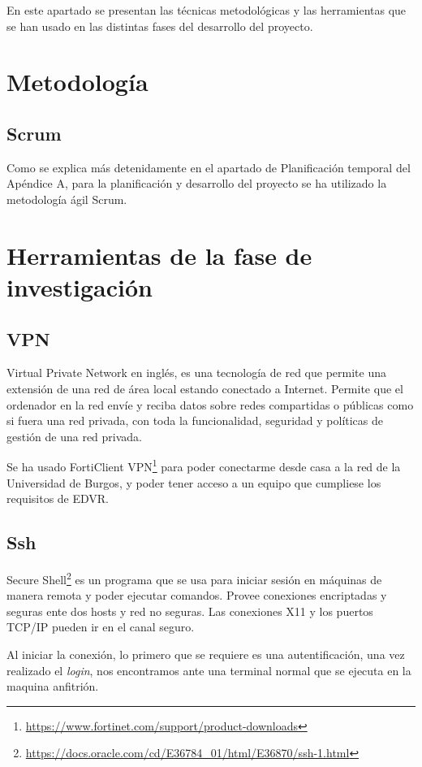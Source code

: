 
En este apartado se presentan las técnicas metodológicas y las herramientas que se han usado en las distintas fases del desarrollo del proyecto.

\section{Metodología}

    \subsection{Scrum}
    Como se explica más detenidamente en el apartado de Planificación temporal del Apéndice A, para la planificación y desarrollo del proyecto se ha utilizado la metodología ágil Scrum.


\section{Herramientas de la fase de investigación}
    
    \subsection{VPN}
    Virtual Private Network en inglés, es una tecnología de red que permite una extensión de una red de área local estando conectado a Internet. Permite que el ordenador en la red envíe y reciba datos sobre redes compartidas o públicas como si fuera una red privada, con toda la funcionalidad, seguridad y políticas de gestión de una red privada.
        
    Se ha usado FortiClient VPN\footnote{\url{https://www.fortinet.com/support/product-downloads}} para poder conectarme desde casa a la red de la Universidad de Burgos, y poder tener acceso a un equipo que cumpliese los requisitos de EDVR. 
        
    \subsection{Ssh}
    Secure Shell\footnote{\url{https://docs.oracle.com/cd/E36784_01/html/E36870/ssh-1.html}} es un programa que se usa para iniciar sesión en máquinas de manera remota y poder ejecutar comandos. Provee conexiones encriptadas y seguras ente dos hosts  y red no seguras. Las conexiones X11 y los puertos TCP/IP pueden ir en el canal seguro.

    Al iniciar la conexión, lo primero que se requiere es una autentificación, una vez realizado el \emph{login}, nos encontramos ante una terminal normal que se ejecuta en la maquina anfitrión.
    
